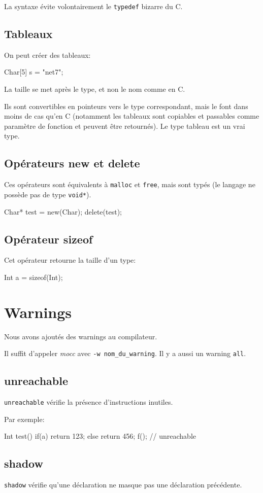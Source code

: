\documentclass{scrartcl}
\newcommand{\mocc}{\textit{mocc}}
\begin{document}
    La syntaxe évite volontairement le \verb+typedef+ bizarre du C.

  \subsection{Tableaux}
    On peut créer des tableaux:
    \begin{moccode}
Char[5] s = "net7";
    \end{moccode}

    La taille se met après le type, et non le nom comme en C.

    Ils sont convertibles en pointeurs vers le type correspondant, mais le font
    dans moins de cas qu'en C (notamment les tableaux sont copiables et
    passables comme paramètre de fonction et peuvent être retournés). Le type
    tableau est un vrai type.

  \subsection{Opérateurs new et delete}\label{new}
    Ces opérateurs sont équivalents à \verb+malloc+ et \verb+free+, mais sont
    typés (le langage ne possède pas de type \verb+void*+).

    \begin{moccode}
Char* test = new(Char);
delete(test);
    \end{moccode}

  \subsection{Opérateur sizeof}
    Cet opérateur retourne la taille d'un type:

    \begin{moccode}
Int a = sizeof(Int);
    \end{moccode}

\section{Warnings}
  Nous avons ajoutés des warnings au compilateur.

  Il suffit d'appeler \mocc{} avec \verb+-w nom_du_warning+.
  Il y a aussi un warning \verb+all+.

  \subsection{unreachable}
    \verb"unreachable" vérifie la présence d'instructions inutiles.

    Par exemple:
    \begin{moccode}
Int test() {
    if(a) {
        return 123;
    }
    else {
        return 456;
    }
    f(); // unreachable
}
    \end{moccode}

  \subsection{shadow}
    \verb"shadow" vérifie qu'une déclaration ne masque pas une déclaration
    précédente.
\end{document}
